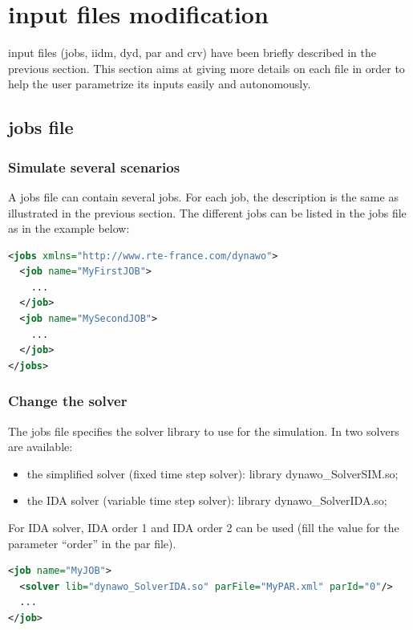 \documentclass[a4paper, 12pt]{report}
\begin{document}
\section[Dynawo input files modification]{\Dynawo input files modification}

\Dynawo input files (jobs, iidm, dyd, par and crv) have been briefly described in the previous section. This section aims at giving more details on each file in order to help the user parametrize its inputs easily and autonomously.

\subsection{jobs file}

\subsubsection{Simulate several scenarios}

A jobs file can contain several jobs. For each job, the description is the same as illustrated in the previous section. The different jobs can be listed in the jobs file as in the example below:

\begin{lstlisting}[language=XML, morekeywords={name}]
<jobs xmlns="http://www.rte-france.com/dynawo">
  <job name="MyFirstJOB">
    ...
  </job>
  <job name="MySecondJOB">
    ...
  </job>
</jobs>
\end{lstlisting}

\subsubsection{Change the solver}

The jobs file specifies the solver library to use for the simulation. In \Dynawo two solvers are available:
\begin{itemize}
\item the simplified solver (fixed time step solver): library dynawo\_SolverSIM.so;
\item the IDA solver (variable time step solver): library dynawo\_SolverIDA.so;
\end{itemize}

For IDA solver, IDA order 1 and IDA order 2 can be used (fill the value for the parameter ``order'' in the par file).

\begin{lstlisting}[language=XML, morekeywords={lib}]
<job name="MyJOB">
  <solver lib="dynawo_SolverIDA.so" parFile="MyPAR.xml" parId="0"/>
  ...
</job>
\end{lstlisting}
\end{document}
